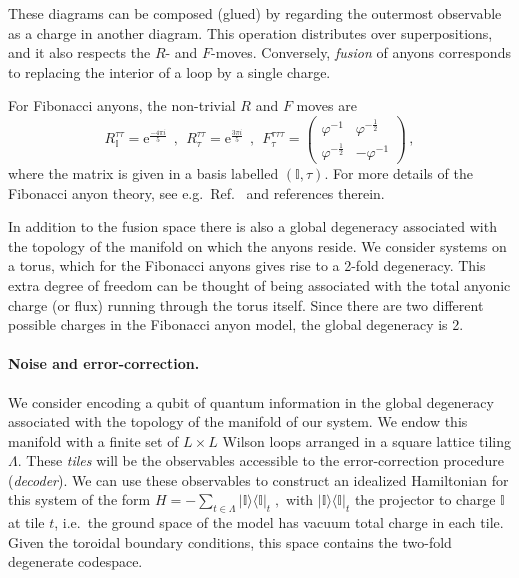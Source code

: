 \documentclass[aps, prl, letterpaper, twocolumn, superscriptaddress, notitlepage, 10pt]{revtex4-1}
\newcommand{\e}{\mathrm{e}}
\newcommand{\vac}{\mathbb{I}}
\newcommand{\ket}[1]{|{#1}\rangle}
\newcommand{\bra}[1]{\langle{#1}|}
\newcommand{\ketbra}[2]{\ket{#1}\!\bra{#2}}
\newcommand{\proj}[1]{\ketbra{#1}{#1}}
\begin{document}
These diagrams can be composed (glued)
by regarding the outermost observable
as a charge in another diagram.
This operation distributes over superpositions, and it also respects the $R$- and $F$-moves.
Conversely, \emph{fusion} of anyons corresponds to 
replacing the interior of a loop by a single charge.

For Fibonacci anyons, the non-trivial $R$ and $F$ moves are 
\begin{equation*}
	R_{\vac}^{\tau\tau} = \e^{\frac{-4\pi i}{5}} 
	\ \ , \ \
	R_\tau^{\tau\tau}= \e^{\frac{3\pi i}{5}} 
	\ \ , \ \
	F_{\tau}^{\tau\tau\tau} = \begin{pmatrix}\varphi^{-1}&\varphi^{-\frac{1}{2}}\\\varphi^{-\frac{1}{2}}&-\varphi^{-1}\end{pmatrix} \,,
\end{equation*}
where the matrix is given in a basis labelled $(\vac,\tau)$. For more details of the Fibonacci anyon theory, see e.g.\ Ref.~\cite{Nayak2008} and references therein. 

In addition to the fusion space there is also a global degeneracy associated with the topology of the 
manifold on which the anyons reside. We consider systems on a torus, 
which for the Fibonacci anyons gives rise to a 2-fold degeneracy.
This extra degree of freedom can be thought of being associated with the total anyonic charge (or flux) running through the torus itself. Since there are two different possible charges in the Fibonacci anyon model, the global degeneracy is 2.

\paragraph{Noise and error-correction.}

We consider encoding a qubit of quantum information in the global degeneracy associated 
with the topology of the manifold of our system.
We endow this manifold with a finite set of $L\times L$ Wilson loops arranged in
a square lattice tiling $\Lambda$.
These \emph{tiles} will be the observables accessible to the error-correction procedure (\emph{decoder}).
We can use these observables to construct an idealized Hamiltonian for this system of the form
 $H=-\sum_{t\in \Lambda}\proj{\vac}_t\;,$ 
with $\proj{\vac}_t$ the projector to charge $\vac$ at tile $t$, i.e.~the ground 
space of the model has vacuum total charge in each tile.
Given the toroidal boundary 
conditions, this space contains the two-fold degenerate codespace.
\end{document}
